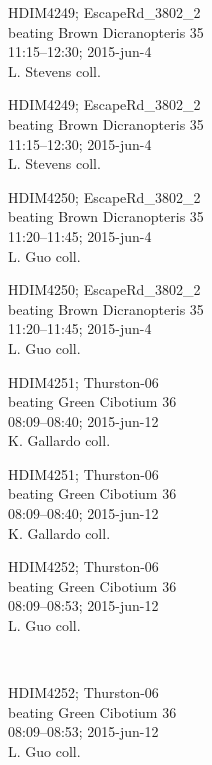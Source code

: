 \documentclass[6pt]{article}
\begin{document}
\noindent
\parbox{0.135\textwidth}{\tiny HDIM4249; EscapeRd\_3802\_2\\ beating Brown Dicranopteris 35\\ 11:15--12:30; 2015-jun-4\\ L. Stevens coll.}
\parbox{0.135\textwidth}{\tiny HDIM4249; EscapeRd\_3802\_2\\ beating Brown Dicranopteris 35\\ 11:15--12:30; 2015-jun-4\\ L. Stevens coll.}
\parbox{0.135\textwidth}{\tiny HDIM4250; EscapeRd\_3802\_2\\ beating Brown Dicranopteris 35\\ 11:20--11:45; 2015-jun-4\\ L. Guo coll.}
\parbox{0.135\textwidth}{\tiny HDIM4250; EscapeRd\_3802\_2\\ beating Brown Dicranopteris 35\\ 11:20--11:45; 2015-jun-4\\ L. Guo coll.}
\parbox{0.135\textwidth}{\tiny HDIM4251; Thurston-06\\ beating Green Cibotium 36\\ 08:09--08:40; 2015-jun-12\\ K. Gallardo coll.}
\parbox{0.135\textwidth}{\tiny HDIM4251; Thurston-06\\ beating Green Cibotium 36\\ 08:09--08:40; 2015-jun-12\\ K. Gallardo coll.}
\parbox{0.135\textwidth}{\tiny HDIM4252; Thurston-06\\ beating Green Cibotium 36\\ 08:09--08:53; 2015-jun-12\\ L. Guo coll.} \\ 
\vspace{0.001in} 

\noindent
\parbox{0.135\textwidth}{\tiny HDIM4252; Thurston-06\\ beating Green Cibotium 36\\ 08:09--08:53; 2015-jun-12\\ L. Guo coll.}
\end{document}
